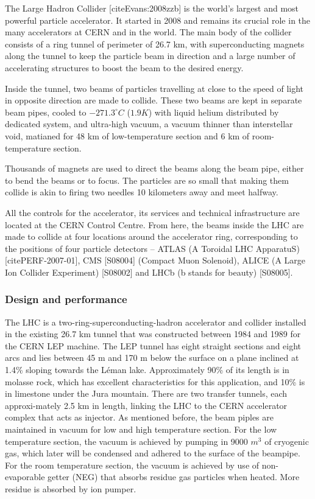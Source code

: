 \documentclass[letterpaper,12pt]{article}
\begin{document}
The Large Hadron Collider [cite{Evans:2008zzb}] is the world's 
largest and most powerful particle accelerator. 
It started in 2008 and remains its crucial role in the many 
accelerators at CERN and in the world.
The main body of the collider consists of a ring tunnel of 
perimeter of 26.7 km, with 
superconducting magnets along the tunnel to keep the 
particle beam in direction
 and a large number of accelerating structures to boost the 
 beam to the desired energy.

Inside the tunnel, two beams of particles travelling at close 
to the speed of light 
in opposite direction are made to collide. 
These two beams are kept in separate beam pipes,
cooled to $-271.3^\circ C$ ($1.9K$) with liquid 
helium distributed by dedicated system, 
 and ultra-high vacuum, a vacuum thinner than 
interstellar void, matianed for 48 km of low-temperature 
section and 6 km of room-temperature 
section. 

Thousands of magnets are used to direct the beams 
along the beam pipe, either to bend the beams or
to focus. The particles are so small that making them collide is akin to 
firing two needles 10 kilometers away and meet halfway. 

All the controls for the accelerator, its services and technical infrastructure 
are located at the CERN Control Centre. 
From here, the beams inside the LHC are made to collide 
at four locations around the accelerator ring, 
corresponding to the positions of four particle 
detectors – ATLAS (A Toroidal LHC ApparatuS) [cite{PERF-2007-01}], 
CMS [S08004] (Compact Muon Solenoid), ALICE (A Large Ion Collider Experiment) [S08002] 
and LHCb (b stands for beauty) [S08005].


	\subsubsection{Design and performance}

	The LHC is a two-ring-superconducting-hadron accelerator and collider
	installed in the existing 26.7 km tunnel that was 
	constructed between 1984 and 1989 
	for the CERN LEP machine. The LEP tunnel has 
	eight straight sections and eight arcs 
	and lies between 45 m and 170 m below the 
	surface on a plane inclined at 1.4\% sloping towards the Léman lake.
	Approximately 90\% of its length is in molasse rock, 
	which has excellent characteristics for this application,
	and 10\% is in limestone under the Jura mountain. 
	There are two transfer tunnels, 
	each approxi-mately 2.5 km in length, linking the 
	LHC to the CERN accelerator complex that acts as injector.
	As mentioned before, the beam piples are maintained in 
	vacuum for low and high temperature section.
	For the low temperature section, the vacuum is achieved 
	by pumping in 9000 $m^3$ of cryogenic
	gas, which later will be condensed and adhered to the 
	surface of the beampipe. For the room temperature
	section, the vacuum is achieved by use of 
	non-evaporable getter (NEG) that absorbs residue gas particles 
	when heated. More residue is absorbed by ion pumper. 
\end{document}
